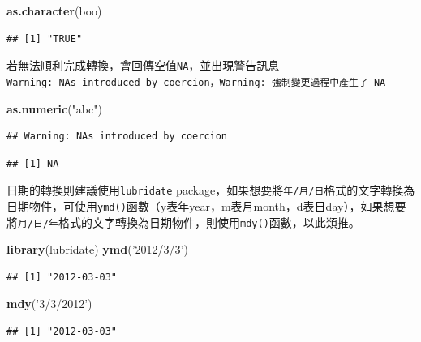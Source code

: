\documentclass[]{book}
\newenvironment{Shaded}{\begin{snugshade}}{\end{snugshade}}
\newcommand{\KeywordTok}[1]{\textcolor[rgb]{0.13,0.29,0.53}{\textbf{{#1}}}}
\newcommand{\StringTok}[1]{\textcolor[rgb]{0.31,0.60,0.02}{{#1}}}
\newcommand{\NormalTok}[1]{{#1}}
\theoremstyle{definition}
\theoremstyle{definition}
\theoremstyle{remark}
\begin{document}
\begin{Shaded}
\begin{Highlighting}[]
\KeywordTok{as.character}\NormalTok{(boo)}
\end{Highlighting}
\end{Shaded}

\begin{verbatim}
## [1] "TRUE"
\end{verbatim}

若無法順利完成轉換，會回傳空值\texttt{NA}，並出現警告訊息\texttt{Warning:\ NAs\ introduced\ by\ coercion，Warning:\ 強制變更過程中產生了\ NA}

\begin{Shaded}
\begin{Highlighting}[]
\KeywordTok{as.numeric}\NormalTok{(}\StringTok{"abc"}\NormalTok{)}
\end{Highlighting}
\end{Shaded}

\begin{verbatim}
## Warning: NAs introduced by coercion
\end{verbatim}

\begin{verbatim}
## [1] NA
\end{verbatim}

日期的轉換則建議使用\texttt{lubridate}\citep{R-lubridate}
package，如果想要將\texttt{年/月/日}格式的文字轉換為日期物件，可使用\texttt{ymd()}函數（y表年year，m表月month，d表日day），如果想要將\texttt{月/日/年}格式的文字轉換為日期物件，則使用\texttt{mdy()}函數，以此類推。

\begin{Shaded}
\begin{Highlighting}[]
\KeywordTok{library}\NormalTok{(lubridate)}
\KeywordTok{ymd}\NormalTok{(}\StringTok{'2012/3/3'}\NormalTok{)}
\end{Highlighting}
\end{Shaded}

\begin{verbatim}
## [1] "2012-03-03"
\end{verbatim}

\begin{Shaded}
\begin{Highlighting}[]
\KeywordTok{mdy}\NormalTok{(}\StringTok{'3/3/2012'}\NormalTok{)}
\end{Highlighting}
\end{Shaded}

\begin{verbatim}
## [1] "2012-03-03"
\end{verbatim}
\end{document}
